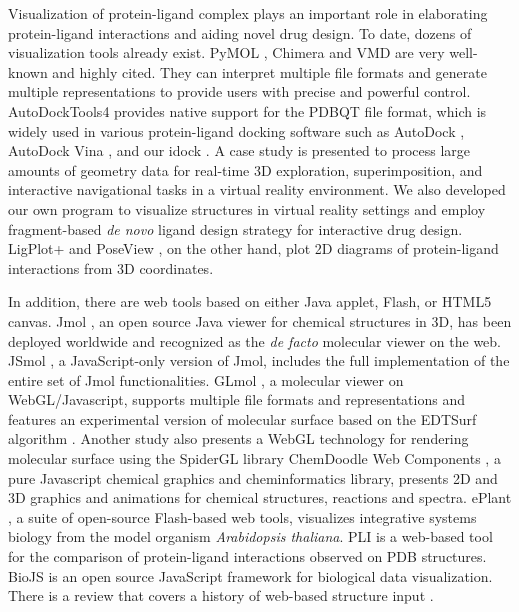 \documentclass{bioinfo}
\begin{document}
Visualization of protein-ligand complex plays an important role in elaborating protein-ligand interactions and aiding novel drug design. To date, dozens of visualization tools already exist. PyMOL \citep{1221}, Chimera \citep{1219} and VMD \citep{1220} are very well-known and highly cited. They can interpret multiple file formats and generate multiple representations to provide users with precise and powerful control. AutoDockTools4 \citep{596} provides native support for the PDBQT file format, which is widely used in various protein-ligand docking software such as AutoDock \citep{596}, AutoDock Vina \citep{595}, and our idock \citep{1153}. A case study \citep{1321} is presented to process large amounts of geometry data for real-time 3D exploration, superimposition, and interactive navigational tasks in a virtual reality environment. We also developed our own program \citep{1265} to visualize structures in virtual reality settings and employ fragment-based \textit{de novo} ligand design strategy for interactive drug design. LigPlot+ \citep{951} and PoseView \citep{748}, on the other hand, plot 2D diagrams of protein-ligand interactions from 3D coordinates.

In addition, there are web tools based on either Java applet, Flash, or HTML5 canvas. Jmol \citep{1263}, an open source Java viewer for chemical structures in 3D, has been deployed worldwide and recognized as the \textit{de facto} molecular viewer on the web. JSmol \citep{1314}, a JavaScript-only version of Jmol, includes the full implementation of the entire set of Jmol functionalities. GLmol \citep{1319}, a molecular viewer on WebGL/Javascript, supports multiple file formats and representations and features an experimental version of molecular surface based on the EDTSurf algorithm \citep{1297}. Another study \citep{1262} also presents a WebGL technology for rendering molecular surface using the SpiderGL library \citep{1320} ChemDoodle Web Components \citep{1264}, a pure Javascript chemical graphics and cheminformatics library, presents 2D and 3D graphics and animations for chemical structures, reactions and spectra. ePlant \citep{1242}, a suite of open-source Flash-based web tools, visualizes integrative systems biology from the model organism \textit{Arabidopsis thaliana}. PLI \citep{1288} is a web-based tool for the comparison of protein-ligand interactions observed on PDB structures. BioJS \citep{1308} is an open source JavaScript framework for biological data visualization. There is a review that covers a history of web-based structure input \citep{1243}.
\end{document}
